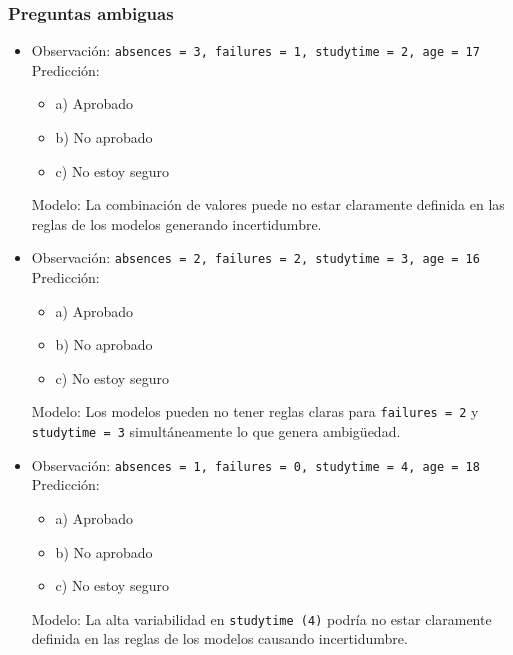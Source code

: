 \subsubsection*{Preguntas ambiguas}
\begin{itemize}
    \item Observación: \texttt{absences = 3, failures = 1, studytime = 2, age = 17}\\
    Predicción:
    \begin{itemize}
        \item a) Aprobado
        \item b) No aprobado
        \item c) No estoy seguro
    \end{itemize}
    Modelo: La combinación de valores puede no estar claramente definida en las reglas de los modelos generando incertidumbre.

    \item Observación: \texttt{absences = 2, failures = 2, studytime = 3, age = 16}\\
    Predicción:
    \begin{itemize}
        \item a) Aprobado
        \item b) No aprobado
        \item c) No estoy seguro
    \end{itemize}
    Modelo: Los modelos pueden no tener reglas claras para \texttt{failures = 2} y \texttt{studytime = 3} simultáneamente lo que genera ambigüedad.

    \item Observación: \texttt{absences = 1, failures = 0, studytime = 4, age = 18}\\
    Predicción:
    \begin{itemize}
        \item a) Aprobado
        \item b) No aprobado
        \item c) No estoy seguro
    \end{itemize}
    Modelo: La alta variabilidad en \texttt{studytime (4)} podría no estar claramente definida en las reglas de los modelos causando incertidumbre.
\end{itemize}

